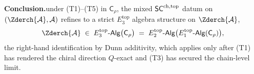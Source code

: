 \begin{theorem}
\noindent\textbf{Conclusion.}\enspace under \textup{(T1)}--\textup{(T5)}
in $\mathsf{C}_{\rho}$, the mixed $\mathsf{SC}^{\mathrm{ch},\mathrm{top}}$ datum on
$(\Zderch{\cA}, \cA)$ refines to a strict $E_{3}^{\mathrm{top}}$
algebra structure on $\Zderch{\cA}$,
\begin{equation}\label{eq:topologisation-Dunn-additivity}
 \Zderch{\cA} \;\in\;
 E_{3}^{\mathrm{top}}\text{-}\mathsf{Alg}\bigl(\mathsf{C}_{\rho}\bigr)
 \;=\; E_{2}^{\mathrm{top}}\text{-}\mathsf{Alg}
 \bigl(E_{1}^{\mathrm{top}}\text{-}\mathsf{Alg}(\mathsf{C}_{\rho})\bigr),
\end{equation}
the right-hand identification by Dunn additivity, which applies only
after \textup{(T1)} has rendered the chiral direction $Q$-exact and
\textup{(T3)} has secured the chain-level limit.
\end{theorem}

